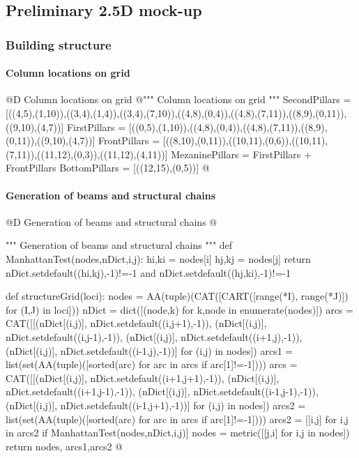 \documentclass[11pt,oneside]{article}    %
\begin{document}
\subsection{Preliminary 2.5D mock-up}

\subsubsection{Building structure}

\paragraph{Column locations on grid}
@D Column locations on grid 
@{""" Column locations on grid """
SecondPillars = [((4,5),(1,10)),((3,4),(1,4)),((3,4),(7,10)),((4,8),(0,4)),((4,8),(7,11)),((8,9),(0,11)),((9,10),(4,7))]
FirstPillars = [((0,5),(1,10)),((4,8),(0,4)),((4,8),(7,11)),((8,9),(0,11)),((9,10),(4,7))]
FrontPillars = [((8,10),(0,11)),((10,11),(0,6)),((10,11),(7,11)),((11,12),(0,3)),((11,12),(4,11))]
MezaninePillars = FirstPillars + FrontPillars
BottomPillars = [((12,15),(0,5))]
@}

\paragraph{Generation of beams and structural chains}
@D Generation of beams and structural chains 
@{""" Generation of beams and structural chains """
def ManhattanTest(nodes,nDict,i,j):
    hi,ki = nodes[i]
    hj,kj = nodes[j]
    return nDict.setdefault((hi,kj),-1)!=-1 and nDict.setdefault((hj,ki),-1)!=-1

def structureGrid(loci):
    nodes = AA(tuple)(CAT([CART([range(*I), range(*J)]) for (I,J) in loci]))
    nDict = dict([(node,k) for k,node in enumerate(nodes)])
    arcs = CAT([[(nDict[(i,j)], nDict.setdefault((i,j+1),-1)),
             (nDict[(i,j)], nDict.setdefault((i,j-1),-1)),
             (nDict[(i,j)], nDict.setdefault((i+1,j),-1)),
             (nDict[(i,j)], nDict.setdefault((i-1,j),-1))] for (i,j) in nodes])
    arcs1 = list(set(AA(tuple)([sorted(arc) for arc in arcs if arc[1]!=-1])))
    arcs = CAT([[(nDict[(i,j)], nDict.setdefault((i+1,j+1),-1)),
             (nDict[(i,j)], nDict.setdefault((i+1,j-1),-1)),
             (nDict[(i,j)], nDict.setdefault((i-1,j-1),-1)),
             (nDict[(i,j)], nDict.setdefault((i-1,j+1),-1))] for (i,j) in nodes])
    arcs2 = list(set(AA(tuple)([sorted(arc) for arc in arcs if arc[1]!=-1])))
    arcs2 = [[i,j] for i,j in arcs2 if ManhattanTest(nodes,nDict,i,j)]
    nodes = metric([[j,i] for i,j in nodes])
    return nodes, arcs1,arcs2
@}
    
\end{document}
